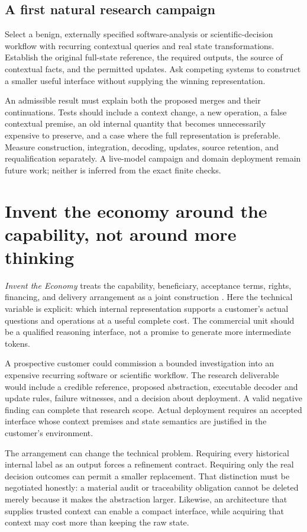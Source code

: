 \documentclass[11pt,letterpaper]{article}
\theoremstyle{remark}\newtheorem{remark}{Remark}[section]
\begin{document}
\subsection{A first natural research campaign}
Select a benign, externally specified software-analysis or scientific-decision workflow with recurring contextual queries and real state transformations. Establish the original full-state reference, the required outputs, the source of contextual facts, and the permitted updates. Ask competing systems to construct a smaller useful interface without supplying the winning representation.

An admissible result must explain both the proposed merges and their continuations. Tests should include a context change, a new operation, a false contextual premise, an old internal quantity that becomes unnecessarily expensive to preserve, and a case where the full representation is preferable. Measure construction, integration, decoding, updates, source retention, and requalification separately. A live-model campaign and domain deployment remain future work; neither is inferred from the exact finite checks.

\section{Invent the economy around the capability, not around more thinking}
\label{sec:economy}
\emph{Invent the Economy} treats the capability, beneficiary, acceptance terms, rights, financing, and delivery arrangement as a joint construction \citep{boucherEconomy}. Here the technical variable is explicit: which internal representation supports a customer's actual questions and operations at a useful complete cost. The commercial unit should be a qualified reasoning interface, not a promise to generate more intermediate tokens.

A prospective customer could commission a bounded investigation into an expensive recurring software or scientific workflow. The research deliverable would include a credible reference, proposed abstraction, executable decoder and update rules, failure witnesses, and a decision about deployment. A valid negative finding can complete that research scope. Actual deployment requires an accepted interface whose context premises and state semantics are justified in the customer's environment.

The arrangement can change the technical problem. Requiring every historical internal label as an output forces a refinement contract. Requiring only the real decision outcomes can permit a smaller replacement. That distinction must be negotiated honestly: a material audit or traceability obligation cannot be deleted merely because it makes the abstraction larger. Likewise, an architecture that supplies trusted context can enable a compact interface, while acquiring that context may cost more than keeping the raw state.
\end{document}
